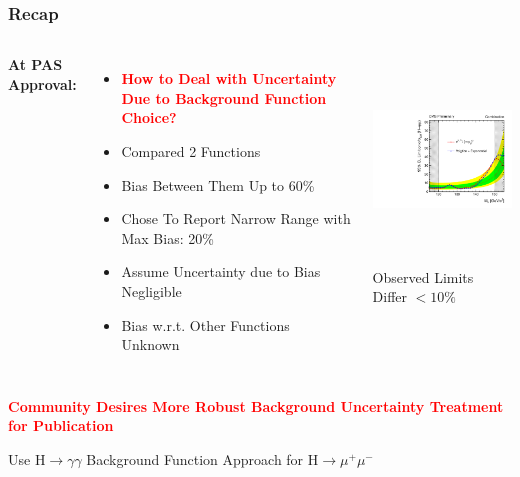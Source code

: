 \documentclass{beamer}
\newcommand{\tredbf}[1]{\textcolor{red}{\bf #1}}
\begin{document}

\begin{frame}
\frametitle{Recap}
\vspace{-1em}
\begin{columns}[c]
 \column{60mm}
    \textbf{At PAS Approval:}
    \begin{itemize}
    \small
      \item \tredbf{How to Deal with Uncertainty Due to Background Function Choice?}
      \item Compared 2 Functions
      \item Bias Between Them Up to 60\%
      \item Chose To Report Narrow Range with Max Bias: 20\%
      \item Assume Uncertainty due to Bias Negligible
      \item Bias w.r.t. Other Functions Unknown
    \end{itemize}
 \column{60mm}
    \begin{center}
      \includegraphics[height=55mm]{plots/limitsComparison_m110to160.pdf}
      \\ \small
      Observed Limits Differ $< 10\%$
    \end{center}
\end{columns}
\begin{center}
  \large \tredbf{Community Desires More Robust Background Uncertainty Treatment for Publication}
\end{center}
\end{frame}


\begin{frame}
  \begin{center}
    \Huge
    Use $\mathrm{H} \rightarrow \gamma\gamma$ Background Function Approach for $\mathrm{H} \rightarrow \mu^+\mu^-$
  \end{center}
\end{frame}
\end{document}
